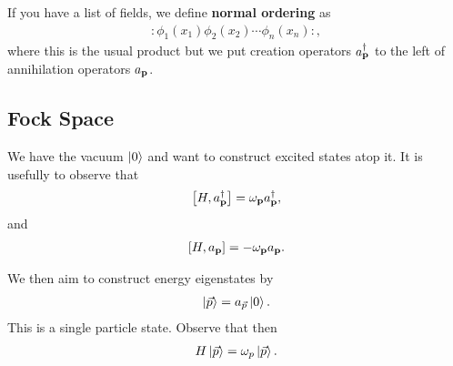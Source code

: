 \begin{definition}
    If you have a list of fields, we define \textbf{normal ordering} as
    \begin{align}
        :\phi_1 \left( x_1 \right) \phi_2 \left( x_2 \right) \cdots \phi_{n}\left( x_{n} \right) :
    ,\end{align}
    where this is the usual product but we put creation operators $a^{\dag}_{\vb{p}}$ to the left of annihilation operators $a_{\vb{p}}$.
\end{definition}

\subsection{Fock Space}

We have the vacuum $\ket{0}$ and want to construct excited states atop it. It is usefully to observe that
\begin{align}
    \left[ H, a^{\dag}_{\vb{p}} \right] = \omega_{\vb{p}} a_{\vb{p}}^{\dag}
,\end{align}
and
\begin{align}
    \left[ H, a_{\vb{p}} \right] = - \omega_{\vb{p}} a_{\vb{p}}
.\end{align}

We then aim to construct energy eigenstates by
\begin{align}
    \ket{\vec{p}} = a_{\vec{p}} \ket{0}
.\end{align}
This is a single particle state. Observe that then
\begin{align}
    H \ket{\vec{p}} = \omega_{p} \ket{\vec{p}}
.\end{align}

